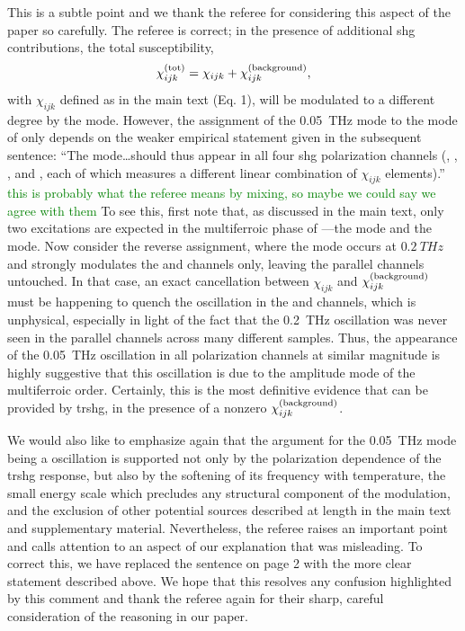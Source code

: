 This is a subtle point and we thank the referee for considering this aspect of the paper so carefully.
The referee is correct; in the presence of additional \gls{shg} contributions, the total susceptibility, 
\begin{equation}
\label{eq:chitot}
\chi^{(\mathrm{tot})}_{ijk} = \chi_{ijk}+\chi^{(\mathrm{background})}_{ijk},
\end{equation}
with $\chi_{ijk}$ defined as in the main text (Eq. 1), will be modulated to a different degree by the \higgs mode.
However, the assignment of the \qty{0.05}{THz} mode to the \higgs mode of  only depends on the weaker empirical statement given in the subsequent sentence: ``The \higgs mode\ldots should thus appear in all four \gls{shg} polarization channels (\PP, \PS, \SP, and \SS, each of which measures a different linear combination of $\chi_{ijk}$ elements).''
\textcolor{green}{this is probably what the referee means by mixing, so maybe we could say we agree with them}
To see this, first note that, as discussed in the main text, only two excitations are expected in the multiferroic phase of ---the \higgs mode and the \goldstone mode.
Now consider the reverse assignment, where the \higgs mode occurs at $\qty{0.2}{THz}$ and strongly modulates the \PS and \SP channels only, leaving the parallel channels untouched.
In that case, an exact cancellation between $\chi_{ijk}$ and $\chi^{(\mathrm{background})}_{ijk}$ must be happening to quench the oscillation in the \PP and \SS channels, which is unphysical, especially in light of the fact that the \qty{0.2}{THz} oscillation was never seen in the parallel channels across many different samples.
Thus, the appearance of the \qty{0.05}{THz} oscillation in all polarization channels at similar magnitude is highly suggestive that this oscillation is due to the amplitude mode of the multiferroic order.
Certainly, this is the most definitive evidence that can be provided by \gls{trshg}, in the presence of a nonzero $\chi^{(\mathrm{background})}_{ijk}$.

We would also like to emphasize again that the argument for the \qty{0.05}{THz} mode being a \higgs oscillation is supported not only by the polarization dependence of the \gls{trshg} response, but also by the softening of its frequency with temperature, the small energy scale which precludes any structural component of the modulation, and the exclusion of other potential sources described at length in the main text and supplementary material.
Nevertheless, the referee raises an important point and calls attention to an aspect of our explanation that was misleading.
To correct this, we have replaced the sentence on page 2 with the more clear statement described above.
We hope that this resolves any confusion highlighted by this comment and thank the referee again for their sharp, careful consideration of the reasoning in our paper.

